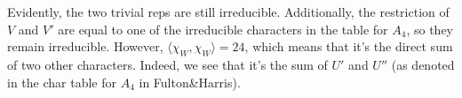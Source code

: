\documentclass{article}
\begin{document}
Evidently, the two trivial reps are still irreducible. Additionally, the restriction of $V$ and $V'$ are equal to one of the irreducible characters in the table for $A_4$, so they remain irreducible. However, $\langle\chi_W,\chi_W\rangle=24$, which means that it's the direct sum of two other characters. Indeed, we see that it's the sum of $U'$ and $U''$ (as denoted in the char table for $A_4$ in Fulton\&Harris).
\end{document}
